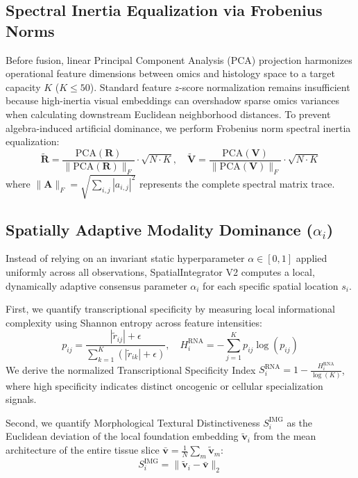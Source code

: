 \documentclass[journal,10pt,twocolumn]{IEEEtran}
\begin{document}
\subsection{Spectral Inertia Equalization via Frobenius Norms}
Before fusion, linear Principal Component Analysis (PCA) projection harmonizes operational feature dimensions between omics and histology space to a target capacity $K$ ($K \le 50$). Standard feature $z$-score normalization remains insufficient because high-inertia visual embeddings can overshadow sparse omics variances when calculating downstream Euclidean neighborhood distances. To prevent algebra-induced artificial dominance, we perform Frobenius norm spectral inertia equalization:
\begin{equation}
\mathbf{\tilde{R}} = \frac{\text{PCA}(\mathbf{R})}{\|\text{PCA}(\mathbf{R})\|_F} \cdot \sqrt{N \cdot K}, \quad \mathbf{\tilde{V}} = \frac{\text{PCA}(\mathbf{V})}{\|\text{PCA}(\mathbf{V})\|_F} \cdot \sqrt{N \cdot K}
\end{equation}
where $\|\mathbf{A}\|_F = \sqrt{\sum_{i,j} |a_{i,j}|^2}$ represents the complete spectral matrix trace.

\subsection{Spatially Adaptive Modality Dominance ($\alpha_i$)}
Instead of relying on an invariant static hyperparameter $\alpha \in [0, 1]$ applied uniformly across all observations, SpatialIntegrator V2 computes a local, dynamically adaptive consensus parameter $\alpha_i$ for each specific spatial location $s_i$. 

First, we quantify transcriptional specificity by measuring local informational complexity using Shannon entropy across feature intensities:
\begin{equation}
p_{ij} = \frac{|\tilde{r}_{ij}| + \epsilon}{\sum_{k=1}^K (|\tilde{r}_{ik}| + \epsilon)}, \quad H_i^{\text{RNA}} = -\sum_{j=1}^K p_{ij} \log(p_{ij})
\end{equation}
We derive the normalized Transcriptional Specificity Index $S_i^{\text{RNA}} = 1 - \frac{H_i^{\text{RNA}}}{\log(K)}$, where high specificity indicates distinct oncogenic or cellular specialization signals.

Second, we quantify Morphological Textural Distinctiveness $S_i^{\text{IMG}}$ as the Euclidean deviation of the local foundation embedding $\mathbf{\tilde{v}}_i$ from the mean architecture of the entire tissue slice $\mathbf{\bar{v}} = \frac{1}{N}\sum_m \mathbf{\tilde{v}}_m$:
\begin{equation}
S_i^{\text{IMG}} = \|\mathbf{\tilde{v}}_i - \mathbf{\bar{v}}\|_2
\end{equation}
\end{document}

